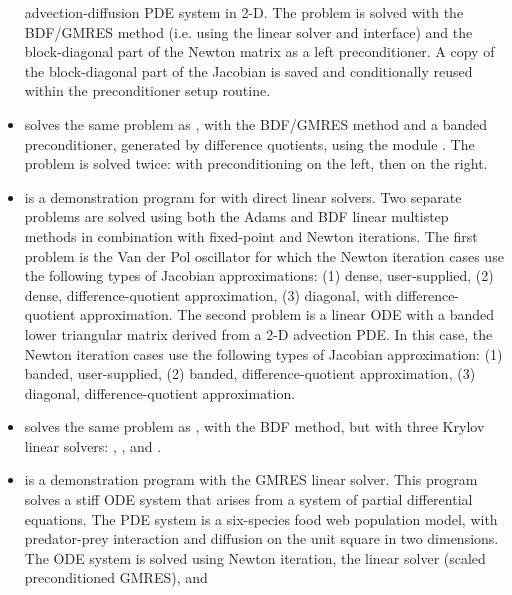 \begin{itemize}
  advection-diffusion PDE system in 2-D.
  \newline
  The problem is solved with the BDF/GMRES method (i.e.
  using the {\sunlinsolspgmr} linear solver and {\cvls} interface)
  and the block-diagonal part of the Newton matrix as a left
  preconditioner. A copy of the block-diagonal part of the Jacobian is
  saved and conditionally reused within the preconditioner setup routine.
\item {}
  solves the same problem as , with the BDF/GMRES method
  and a banded preconditioner, generated by difference quotients,
  using the module {\cvbandpre}.
  \newline
  The problem is solved twice: with preconditioning on the left,
  then on the right.
\item {}
  is a demonstration program for {\cvode} with direct linear solvers.
  \newline
  Two separate problems are solved using both the Adams and BDF linear
  multistep methods in combination with fixed-point and Newton
  iterations.
  \newline
  The first problem is the Van der Pol oscillator for which
  the Newton iteration cases use the following types of Jacobian approximations:
  (1) dense, user-supplied, (2) dense, difference-quotient approximation,
  (3) diagonal, with difference-quotient approximation. The second
  problem is a linear ODE with a
  banded lower triangular matrix derived from a 2-D advection PDE. In this
  case, the Newton iteration cases use the following types of Jacobian
  approximation: (1) banded, user-supplied, (2) banded, difference-quotient
  approximation, (3) diagonal, difference-quotient approximation.
\item {}
  solves the same problem as , with the BDF method, but with
  three Krylov linear solvers: {\sunlinsolspgmr}, {\sunlinsolspbcgs},
  and {\sunlinsolsptfqmr}.
\item {}
  is a demonstration program with the GMRES linear solver.
  \newline
  This program solves a stiff ODE system that arises from a system
  of partial differential equations.  The PDE system is a six-species
  food web population model, with predator-prey interaction and diffusion
  on the unit square in two dimensions.
  \newline
  The ODE system is solved using Newton iteration, the
  {\sunlinsolspgmr} linear solver (scaled preconditioned GMRES), and

\end{itemize}
